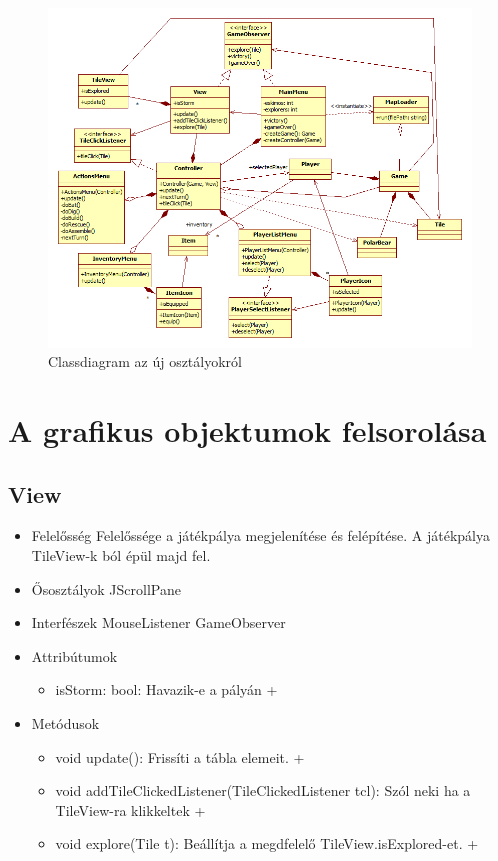 \begin{figure}[H]
	\begin{center}
		\includegraphics[width=17cm]{chapters/chapter11/classdiagram.png}
		\caption{Classdiagram az új osztályokról}
		\label{fig:classdiagram}
	\end{center}
\end{figure}

\section{A grafikus objektumok felsorolása}

\subsection{View}
\begin{itemize}
\item Felelősség\newline
Felelőssége a játékpálya megjelenítése és felépítése. A játékpálya TileView-k ból épül majd fel.
\item Ősosztályok\newline
JScrollPane
\item Interfészek\newline
MouseListener GameObserver
\item Attribútumok\newline
	\begin{itemize}
		\item isStorm: bool: Havazik-e a pályán +
	\end{itemize}
\item Metódusok\newline
	\begin{itemize}
		\item void update(): Frissíti a tábla elemeit. +
		\item void addTileClickedListener(TileClickedListener tcl): Szól neki ha a TileView-ra klikkeltek +
		\item void explore(Tile t): Beállítja a megdfelelő TileView.isExplored-et. +
	\end{itemize}
\end{itemize}


